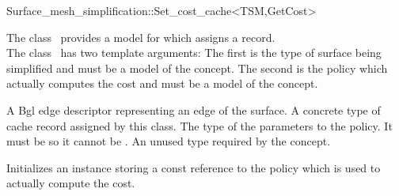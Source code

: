 

\begin{ccRefClass}{Surface_mesh_simplification::Set_cost_cache<TSM,GetCost>}


\ccDefinition

The class \ccRefName\ provides a model for 
which assigns a  record.\\ 
The class \ccRefName\ has two
template arguments: The first is the type of surface being simplified
and must be a model of the  concept. The
second is the policy which actually computes the cost and must
be a model of the  concept.

\ccIsModel
{}


\ccTypes
  \ccGlue
  {A {\sc Bgl} edge descriptor representing an edge of the surface.}
  \ccGlue
  {A concrete type of cache record assigned by this class.}
  \ccGlue
  {The type of the parameters to the  policy. 
  It must be  so it cannot be .}
  \ccGlue
  {An unused type required by the  concept.}

\ccCreation
{}  %

{Initializes an instance storing a const reference to the  policy which is used to actually compute the cost.}


\end{ccRefClass}
